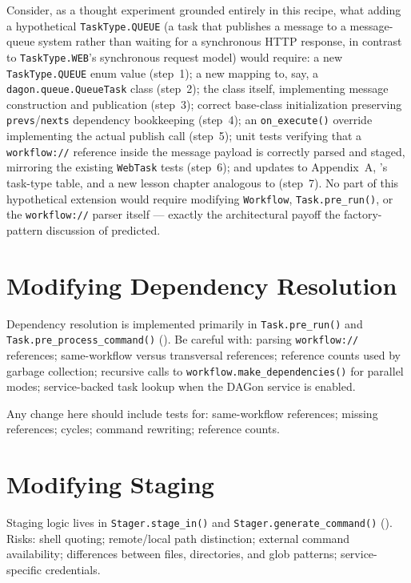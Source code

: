\begin{example}
Consider, as a thought experiment grounded entirely in this recipe, what
adding a hypothetical \texttt{TaskType.QUEUE} (a task that publishes a
message to a message-queue system rather than waiting for a synchronous
HTTP response, in contrast to \texttt{TaskType.WEB}'s synchronous request
model) would require: a new \texttt{TaskType.QUEUE} enum value (step~1); a
new mapping to, say, a \texttt{dagon.queue.QueueTask} class (step~2); the
class itself, implementing message construction and publication (step~3);
correct base-class initialization preserving \texttt{prevs}/\texttt{nexts}
dependency bookkeeping (step~4); an \texttt{on\_execute()} override
implementing the actual publish call (step~5); unit tests verifying that a
\texttt{workflow://} reference inside the message payload is correctly
parsed and staged, mirroring the existing \texttt{WebTask} tests (step~6);
and updates to Appendix~A, 's task-type table, and a
new lesson chapter analogous to  (step~7). No part of
this hypothetical extension would require modifying \texttt{Workflow},
\texttt{Task.pre\_run()}, or the \texttt{workflow://} parser itself ---
exactly the architectural payoff the factory-pattern discussion of
 predicted.
\end{example}

\section{Modifying Dependency Resolution}

Dependency resolution is implemented primarily in \texttt{Task.pre\_run()}
and \texttt{Task.pre\_process\_command()} (). Be careful
with: parsing \texttt{workflow://} references; same-workflow versus
transversal references; reference counts used by garbage collection;
recursive calls to \texttt{workflow.make\_dependencies()} for parallel
modes; service-backed task lookup when the DAGon service is enabled.

Any change here should include tests for: same-workflow references; missing
references; cycles; command rewriting; reference counts.

\section{Modifying Staging}

Staging logic lives in \texttt{Stager.stage\_in()} and
\texttt{Stager.generate\_command()} ().
Risks: shell quoting; remote/local path distinction; external command
availability; differences between files, directories, and glob patterns;
service-specific credentials.

